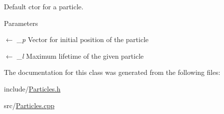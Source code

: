 Default ctor for a particle. 
\begin{DoxyParams}{Parameters}
\item[\mbox{$\leftarrow$} {\em \_\-p}]Vector for initial position of the particle \item[\mbox{$\leftarrow$} {\em \_\-l}]Maximum lifetime of the given particle \end{DoxyParams}


The documentation for this class was generated from the following files:\begin{DoxyCompactItemize}
\item 
include/\hyperlink{Particles_8h}{Particles.h}\item 
src/\hyperlink{Particles_8cpp}{Particles.cpp}\end{DoxyCompactItemize}
